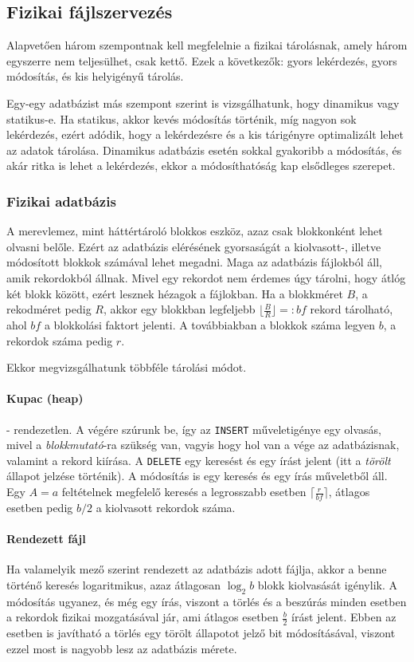 \documentclass[fleqn,10pt,a4paper]{article}
\theoremstyle{magyar}
\begin{document}
  \subsection{Fizikai fájlszervezés}
  Alapvetően három szempontnak kell megfelelnie a fizikai tárolásnak, amely három egyszerre nem teljesülhet, csak
  kettő. Ezek a következők:  gyors lekérdezés, gyors módosítás, és kis helyigényű tárolás.

  Egy-egy adatbázist más szempont szerint is vizsgálhatunk, hogy dinamikus vagy statikus-e. Ha statikus, akkor kevés
  módosítás történik, míg nagyon sok lekérdezés, ezért adódik, hogy a lekérdezésre és a kis tárigényre optimalizált
  lehet az adatok tárolása. Dinamikus adatbázis esetén sokkal gyakoribb a módosítás, és akár ritka is lehet a
  lekérdezés, ekkor a módosíthatóság kap elsődleges szerepet.

  
  \subsubsection{Fizikai adatbázis}  A merevlemez, mint háttértároló blokkos eszköz, azaz csak blokkonként lehet olvasni
  belőle. Ezért az adatbázis  elérésének gyorsaságát a kiolvasott-, illetve módosított blokkok számával lehet
  megadni. Maga az adatbázis fájlokból áll, amik rekordokból állnak. Mivel egy rekordot nem érdemes úgy tárolni, hogy
  átlóg két blokk között, ezért lesznek hézagok a fájlokban. Ha a blokkméret $B$, a rekodméret pedig $R$, akkor egy
  blokkban legfeljebb $\lfloor \frac{B}{R} \rfloor =: bf$ rekord tárolható, ahol $bf$ a blokkolási faktort jelenti. A
  továbbiakban a blokkok száma legyen $b$, a rekordok száma pedig $r$.

  Ekkor megvizsgálhatunk többféle tárolási módot.
  
  \paragraph{Kupac (heap)} - rendezetlen. A végére szúrunk be, így az \texttt{INSERT} műveletigénye egy olvasás, mivel a
  \emph{blokkmutató}-ra szükség van, vagyis hogy hol van a vége az adatbázisnak, valamint a rekord kiírása. A
  \texttt{DELETE} egy keresést és egy írást jelent (itt a \emph{törölt} állapot jelzése történik). A módosítás is egy
  keresés és egy írás műveletből áll. Egy $A=a$ feltételnek megfelelő keresés a legrosszabb esetben $\lceil
  \frac{r}{bf}\rceil$, átlagos esetben pedig $b/2$ a kiolvasott rekordok száma. 
  
  \paragraph{Rendezett fájl} Ha valamelyik mező szerint rendezett az adatbázis adott fájlja, akkor a benne történő
  keresés logaritmikus, azaz átlagosan $\log_2b$ blokk kiolvasását igénylik. A módosítás ugyanez, és még egy írás,
  viszont a törlés és a beszúrás minden esetben a rekordok fizikai mozgatásával jár, ami átlagos esetben $\frac b2$
  írást jelent. Ebben az esetben is javítható a törlés egy törölt állapotot jelző bit módosításával, viszont ezzel most
  is nagyobb lesz az adatbázis mérete.
\end{document}
